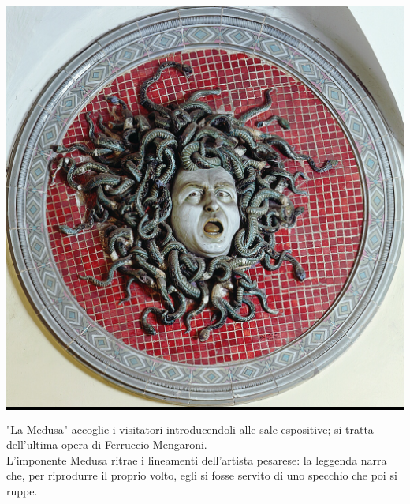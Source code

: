 \documentclass[hidelinks,12pt,a4paper,openright,twoside]{book}
\begin{document}
			\begin{minipage}{0.5\linewidth}
				\begin{center}
					\colorbox{black}{\includegraphics[scale = 1.2]{Mengaroni_Ferruccio-Medusa.jpg}}
				\end{center}
				\begin{center}
					\begin{minipage}{\linewidth}
						\raggedright
						"La Medusa" accoglie i visitatori introducendoli alle sale espositive; si tratta dell'ultima opera di Ferruccio Mengaroni.\\
						L'imponente Medusa ritrae i lineamenti dell'artista pesarese: la leggenda narra che, per riprodurre il proprio volto, egli si fosse servito di uno specchio che poi si ruppe.
					\end{minipage}
			\end{center}
			\end{minipage}
		
		\vspace{10mm}
		
\end{document}
